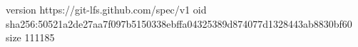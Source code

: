 version https://git-lfs.github.com/spec/v1
oid sha256:50521a2de27aa7f097b5150338ebffa04325389d874077d1328443ab8830bf60
size 111185
